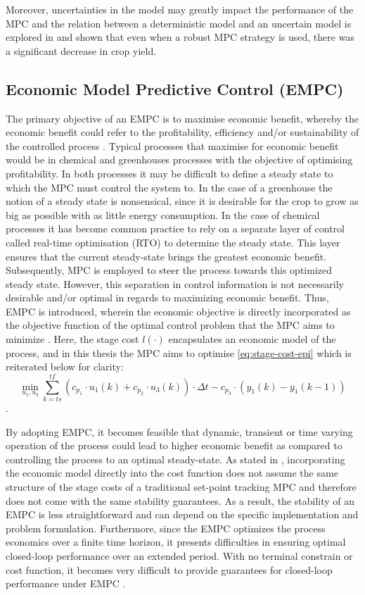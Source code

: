 Moreover, uncertainties in the model may greatly impact the performance of the MPC and the relation between a deterministic model and an uncertain model is explored in \citet{boersmaRobustSamplebasedModel2022} and shown that even when a robust MPC strategy is used, there was a significant decrease in crop yield.

\subsection{Economic Model Predictive Control (EMPC)}
The primary objective of an EMPC is to maximise economic benefit, whereby the economic benefit could refer to the profitability, efficiency and/or sustainability of the controlled process \cite{ellisTutorialReviewEconomic2014}. Typical processes that maximise for economic benefit would be in chemical and greenhouses processes with the objective of optimising profitability. In both processes it may be difficult to define a steady state to which the MPC must control the system to. In the case of a greenhouse the notion of a steady state is nonsensical, since it is desirable for the crop to grow as big as possible with as little energy consumption. In the case of chemical processes it has become common practice to rely on a separate layer of control called real-time optimisation (RTO) to determine the steady state. This layer ensures that the current steady-state brings the greatest economic benefit. Subsequently, MPC is employed to steer the process towards this optimized steady state. However, this separation in control information is not necessarily desirable and/or optimal in regards to maximizing economic benefit. Thus, EMPC is introduced, wherein the economic objective is directly incorporated as the objective function of the optimal control problem that the MPC aims to minimize \cite{rawlingsFundamentalsEconomicModel2012}. Here, the stage cost $l(\cdot)$ encapsulates an economic model of the process, and in this thesis the MPC aims to optimise \autoref{eq:stage-cost-epi} which is reiterated below for clarity: $$\min_{u_1,u_3} \sum_{k = ts}^{tf} {(c_{p_1} \cdot u_1(k) + c_{p_2} \cdot u_3(k))\cdot \Delta t - c_{p_3} \cdot (y_1(k) - y_1(k-1))}$$.

By adopting EMPC, it becomes feasible that dynamic, transient or time varying operation of the process could lead to higher economic benefit as compared to controlling the process to an optimal steady-state. As stated in \cite{rawlingsFundamentalsEconomicModel2012}, incorporating the economic model directly into the cost function does not assume the same structure of the stage costs of a traditional set-point tracking MPC and therefore  does not come with the same stability guarantees. As a result, the stability of an EMPC is less straightforward and can depend on the specific implementation and problem formulation. Furthermore, since the EMPC optimizes the process economics over a finite time horizon, it presents difficulties in ensuring optimal closed-loop performance over an extended period. With no terminal constrain or cost function, it becomes very difficult to provide guarantees for closed-loop performance under EMPC \cite{ellisTutorialReviewEconomic2014}.

